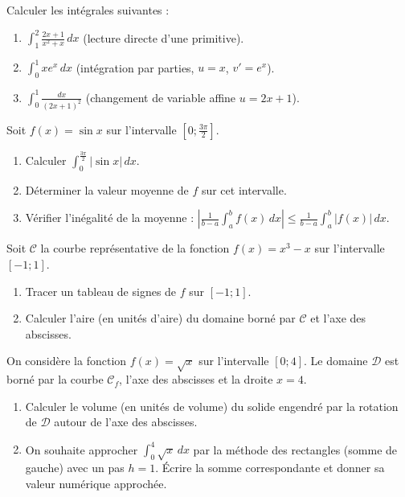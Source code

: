 \documentclass[11pt]{article}
\begin{document}
\begin{exercice}
Calculer les intégrales suivantes :
\begin{enumerate}
    \item $\displaystyle \int_{1}^{2} \frac{2x+1}{x^2+x}\,dx$ \quad (lecture directe d'une primitive).
    \item $\displaystyle \int_{0}^{1} x e^{x}\,dx$ \quad (intégration par parties, $u=x$, $v'=e^x$).
    \item $\displaystyle \int_{0}^{1} \frac{dx}{(2x+1)^2}$ \quad (changement de variable affine $u=2x+1$).
\end{enumerate}
\end{exercice}

\begin{exercice}
Soit $f(x) = \sin x$ sur l'intervalle $\left[0 ; \frac{3\pi}{2}\right]$.
\begin{enumerate}
    \item Calculer $\displaystyle \int_{0}^{\frac{3\pi}{2}} |\sin x|\,dx$.
    \item Déterminer la valeur moyenne de $f$ sur cet intervalle.
    \item Vérifier l'inégalité de la moyenne : $\left|\frac{1}{b-a}\int_{a}^{b} f(x)\,dx\right| \leq \frac{1}{b-a}\int_{a}^{b} |f(x)|\,dx$.
\end{enumerate}
\end{exercice}

\begin{exercice}
Soit $\mathcal{C}$ la courbe représentative de la fonction $f(x) = x^3 - x$ sur l'intervalle $[-1 ; 1]$.
\begin{enumerate}
    \item Tracer un tableau de signes de $f$ sur $[-1 ; 1]$.
    \item Calculer l'aire (en unités d'aire) du domaine borné par $\mathcal{C}$ et l'axe des abscisses.
\end{enumerate}
\end{exercice}

\begin{exercice}
On considère la fonction $f(x) = \sqrt{x}$ sur l'intervalle $[0 ; 4]$. Le domaine $\mathcal{D}$ est borné par la courbe $\mathcal{C}_f$, l'axe des abscisses et la droite $x=4$.
\begin{enumerate}
    \item Calculer le volume (en unités de volume) du solide engendré par la rotation de $\mathcal{D}$ autour de l'axe des abscisses.
    \item On souhaite approcher $\int_{0}^{4} \sqrt{x}\,dx$ par la méthode des rectangles (somme de gauche) avec un pas $h=1$. Écrire la somme correspondante et donner sa valeur numérique approchée.
\end{enumerate}
\end{exercice}
\end{document}
